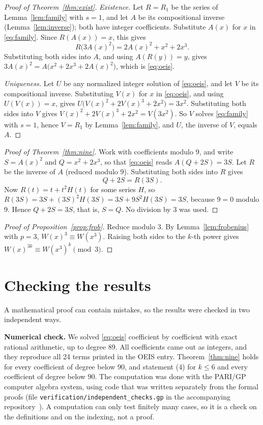 \documentclass[11pt,a4paper]{article}
\theoremstyle{definition}
\theoremstyle{remark}
\newcommand{\para}[1]{\par\medskip\noindent\textbf{#1}\enspace}
\begin{document}
\begin{proof}[Proof of Theorem~\ref{thm:exist}]
\emph{Existence.} Let $R=R_1$ be the series of Lemma~\ref{lem:family} with $s=1$, and let $A$ be its compositional
inverse (Lemma~\ref{lem:inverse}); both have integer coefficients. Substitute $A(x)$ for $x$ in \eqref{eq:family}.
Since $R(A(x))=x$, this gives
\[
R\bigl(3A(x)^2\bigr)=2A(x)^2+x^2+2x^3 .
\]
Substituting both sides into $A$, and using $A(R(y))=y$, gives $3A(x)^2=A\bigl(x^2+2x^3+2A(x)^2\bigr)$, which is
\eqref{eq:oeis}.

\emph{Uniqueness.} Let $U$ be any normalized integer solution of \eqref{eq:oeis}, and let $V$ be its compositional
inverse. Substituting $V(x)$ for $x$ in \eqref{eq:oeis}, and using $U(V(x))=x$, gives
$U\bigl(V(x)^2+2V(x)^3+2x^2\bigr)=3x^2$. Substituting both sides into $V$ gives $V(x)^2+2V(x)^3+2x^2=V(3x^2)$. So $V$
solves \eqref{eq:family} with $s=1$, hence $V=R_1$ by Lemma~\ref{lem:family}, and $U$, the inverse of $V$, equals $A$.
\end{proof}

\begin{proof}[Proof of Theorem~\ref{thm:nine}]
Work with coefficients modulo $9$, and write $S=A(x)^2$ and $Q=x^2+2x^3$, so that \eqref{eq:oeis} reads
$A(Q+2S)=3S$. Let $R$ be the inverse of $A$ (reduced modulo $9$). Substituting both sides into $R$ gives
\[
Q+2S=R(3S).
\]
Now $R(t)=t+t^2H(t)$ for some series $H$, so $R(3S)=3S+(3S)^2H(3S)=3S+9S^2H(3S)=3S$, because $9=0$ modulo $9$. Hence
$Q+2S=3S$, that is, $S=Q$. No division by $3$ was used.
\end{proof}

\begin{proof}[Proof of Proposition~\ref{prop:frob}]
Reduce modulo $3$. By Lemma~\ref{lem:frobenius} with $p=3$, $W(x)^3\equiv W(x^3)$. Raising both sides to the $k$-th
power gives $W(x)^{3k}\equiv W(x^3)^k\pmod 3$.
\end{proof}

\section{Checking the results}\label{sec:checks}

A mathematical proof can contain mistakes, so the results were checked in two independent ways.

\para{Numerical check.}
We solved \eqref{eq:oeis} coefficient by coefficient with exact rational arithmetic, up to degree $89$. All
coefficients came out as integers, and they reproduce all 24 terms printed in the OEIS entry. Theorem~\ref{thm:nine}
holds for every coefficient of degree below $90$, and statement (4) for $k\le6$ and every coefficient of degree below
$90$.
The computation was done with the PARI/GP computer algebra system, using code that was written separately from the
formal proofs (file \texttt{verification/independent\_checks.gp} in the accompanying repository~\cite{repo}).
A computation can only test finitely many cases, so it is a check on the definitions and on the indexing, not a proof.
\end{document}
